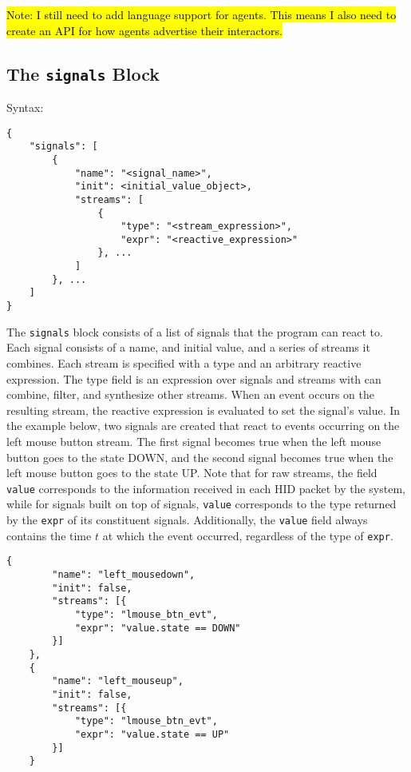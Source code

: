 \documentclass{article}
\begin{document}
\hl{Note: I still need to add language support for agents.
This means I also need to create an API for how agents advertise their interactors.}

\subsection{The \texttt{signals} Block}
Syntax:

\begin{Verbatim}[baselinestretch=1.0]
{
    "signals": [
        {
            "name": "<signal_name>",
            "init": <initial_value_object>,
            "streams": [
                {
                    "type": "<stream_expression>",
                    "expr": "<reactive_expression>"
                }, ...
            ]
        }, ...
    ]
}
\end{Verbatim}

The \texttt{signals} block consists of a list of signals that the program can react to.
Each signal consists of a name, and initial value, and a series of streams it combines. Each stream is specified with a type and an arbitrary reactive expression. The type field is an expression over signals and streams with can combine, filter, and synthesize other streams. When an event occurs on the resulting stream, the reactive expression is evaluated to set the signal's value. In the example below, two signals are created that react to events occurring on the left mouse button stream. The first signal becomes true when the left mouse button goes to the state DOWN, and the second signal becomes true when the left mouse button goes to the state UP. Note that for raw streams, the field \texttt{value} corresponds to the information received in each HID packet by the system, while for signals built on top of signals, \texttt{value} corresponds to the type returned by the \texttt{expr} of its constituent signals. Additionally, the \texttt{value} field always contains the time $t$ at which the event occurred, regardless of the type of \texttt{expr}.

\begin{Verbatim}[baselinestretch=1.0]
    {
        "name": "left_mousedown",
        "init": false,
        "streams": [{
            "type": "lmouse_btn_evt",
            "expr": "value.state == DOWN"
        }]
    },
    {
        "name": "left_mouseup",
        "init": false,
        "streams": [{
            "type": "lmouse_btn_evt",
            "expr": "value.state == UP"
        }]
    }
\end{Verbatim}
\end{document}
